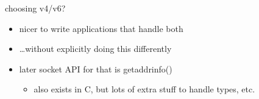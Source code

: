 \begin{frame}{choosing v4/v6?}
    \begin{itemize}
    \item nicer to write applications that handle both
    \item \ldots without explicitly doing this differently
    \vspace{.5cm}
    \item later socket API for that is getaddrinfo()
        \begin{itemize}
        \item also exists in C, but lots of extra stuff to handle types, etc.
        \end{itemize}
    \end{itemize}
\end{frame}

